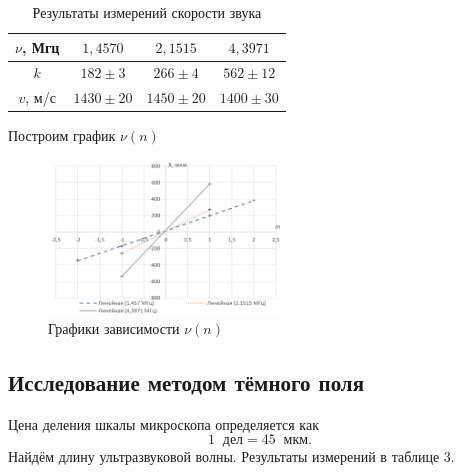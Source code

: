 \documentclass[a4paper]{article}
\begin{document}
\begin{table}[!ht]
    \centering
    \caption{Результаты измерений скорости звука}
    \begin{tabular}{|c|c|c|c|}
    \hline
    $\nu$, Мгц & $1,4570$      & $2,1515$      & $4,3971$      \\ \hline
    $k$        & $182 \pm 3$   & $266 \pm 4$   & $562 \pm 12$  \\ \hline
    $v$, м/с   & $1430 \pm 20$ & $1450 \pm 20$ & $1400 \pm 30$ \\ \hline
    \end{tabular}
    \end{table}


Построим график $\nu(n)$
\begin{figure}[h]
			\begin{center}
				\includegraphics[width = 0.55\textwidth]{images/Im1.jpg}
		        \caption{Графики зависимости $\nu(n)$}
			\end{center}
    \end{figure}

\subsection{Исследование методом тёмного поля}


Цена деления шкалы микроскопа определяется как $$1 \;\;\text{дел} = 45 \;\;\text{мкм}.$$ Найдём длину ультразвуковой волны. Результаты измерений в таблице 3.
\end{document}
